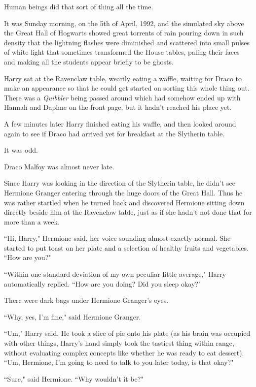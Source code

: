 Human beings did that sort of thing all the time.

\later

It was Sunday morning, on the 5th of April, 1992, and the simulated sky above the Great Hall of Hogwarts showed great torrents of rain pouring down in such density that the lightning flashes were diminished and scattered into small pulses of white light that sometimes transformed the House tables, paling their faces and making all the students appear briefly to be ghosts.

Harry sat at the Ravenclaw table, wearily eating a waffle, waiting for Draco to make an appearance so that he could get started on sorting this whole thing out. There was a \emph{Quibbler} being passed around which had somehow ended up with Hannah and Daphne on the front page, but it hadn't reached his place yet.

A few minutes later Harry finished eating his waffle, and then looked around again to see if Draco had arrived yet for breakfast at the Slytherin table.

It was odd.

Draco Malfoy was almost never late.

Since Harry was looking in the direction of the Slytherin table, he didn't see Hermione Granger entering through the huge doors of the Great Hall. Thus he was rather startled when he turned back and discovered Hermione sitting down directly beside him at the Ravenclaw table, just as if she hadn't not done that for more than a week.

``Hi, Harry," Hermione said, her voice sounding almost exactly normal. She started to put toast on her plate and a selection of healthy fruits and vegetables. ``How are you?"

``Within one standard deviation of my own peculiar little average," Harry automatically replied. ``How are you doing? Did you sleep okay?"

There were dark bags under Hermione Granger's eyes.

``Why, yes, I'm fine," said Hermione Granger.

``Um," Harry said. He took a slice of pie onto his plate (as his brain was occupied with other things, Harry's hand simply took the tastiest thing within range, without evaluating complex concepts like whether he was ready to eat dessert). ``Um, Hermione, I'm going to need to talk to you later today, is that okay?"

``Sure," said Hermione. ``Why wouldn't it be?"

